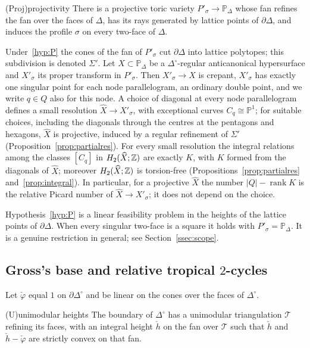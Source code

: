 \begin{hypothesis}{(Proj)}{projectivity}\label{hyp:P}
There is a projective toric variety $P'_\sigma\to\mathbb P_\Delta$ whose fan refines the fan over the faces of $\Delta$,
has its rays generated by lattice points of $\partial\Delta$, and induces the profile $\sigma$ on every two-face of $\Delta$.
\end{hypothesis}

Under~\ref{hyp:P} the cones of the fan of $P'_\sigma$ cut $\partial\Delta$ into lattice polytopes; this subdivision is
denoted $\Sigma'$. Let $X\subset\mathbb P_\Delta$ be a $\Delta^\circ$-regular anticanonical hypersurface and $X'_\sigma$ its
proper transform in $P'_\sigma$. Then $X'_\sigma\to X$ is crepant, $X'_\sigma$ has exactly one singular point for each
node parallelogram, an ordinary double point, and we write $q\in Q$ also for this node. A choice of diagonal at every
node parallelogram defines a small resolution $\widehat X\to X'_\sigma$, with exceptional curves $C_q\cong\mathbb P^1$;
for suitable choices, including the diagonals through the centres at the pentagons and hexagons, $\widehat X$ is
projective, induced by a regular refinement of $\Sigma'$ (Proposition~\ref{prop:partialres}). For every small resolution the
integral relations among the classes $[C_q]$ in $H_2(\widehat X;\mathbb Z)$ are exactly $K$, with $K$ formed from the diagonals
of $\widehat X$; moreover $H_2(\widehat X;\mathbb Z)$ is torsion-free (Propositions~\ref{prop:partialres} and~\ref{prop:integral}). In particular, for a projective $\widehat X$ the number
$|Q|-\operatorname{rank}K$ is the relative Picard number of $\widehat X\to X'_\sigma$; it does not depend on the choice.

Hypothesis~\ref{hyp:P} is a linear feasibility problem in the heights of the lattice points of $\partial\Delta$. When
every singular two-face is a square it holds with $P'_\sigma=\mathbb P_\Delta$. It is a genuine restriction in general;
see Section~\ref{ssec:scope}.

\subsection{Gross's base and relative tropical \texorpdfstring{$2$}{2}-cycles}\label{ssec:tropical}
Let $\check\varphi$ equal $1$ on $\partial\Delta^\circ$ and be linear on the cones over the faces of $\Delta^\circ$.

\begin{hypothesis}{(U)}{unimodular heights}\label{hyp:U}
The boundary of $\Delta^\circ$ has a unimodular triangulation $\mathcal T$ refining its faces, with an integral height
$\check h$ on the fan over $\mathcal T$ such that $\check h$ and $\check h-\check\varphi$ are strictly convex on that fan.
\end{hypothesis}


